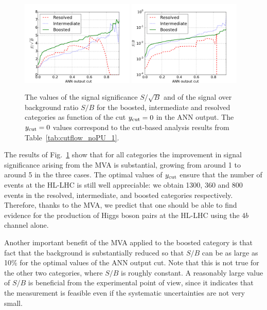 \begin{figure}[t]
\begin{center}
\includegraphics[width=0.48\textwidth]{plots/ssb_noPU.pdf}
\includegraphics[width=0.48\textwidth]{plots/sb_noPU.pdf}
\caption{\small
  The values of the signal significance $S/\sqrt{B}$ and of the
  signal over background ratio $S/B$ for the boosted, intermediate
  and resolved categories as  function of the cut
  $y_{\rm cut}=0$ in the ANN output.
  The $y_{\rm cut}=0$
  values correspond to the  cut-based analysis
  results from Table~\ref{tab:cutflow_noPU_1}.
}
\label{fig:sb_mva}
\end{center}
\end{figure}

The results of Fig.~\ref{fig:sb_mva}  show that
for all categories the  improvement in signal
significance arising from the MVA is substantial, growing from around 1
to around 5 in the three cases.
%
The optimal values of $y_{\rm cut}$ ensure that the
number of events at the HL-LHC is still well appreciable: we obtain
1300, 360 and 800 events in the resolved, intermediate, and
boosted categories respectively.
%
Therefore, thanks to the MVA, we predict that one should be able
to find evidence for the production of Higgs boson pairs
at the HL-LHC using the $4b$ channel alone.

Another important benefit of the MVA applied to the boosted
category is that fact that the background is substantially
reduced so that $S/B$ can be as large as 10\% for the optimal
values of the ANN output cut.
%
Note that this is not true for the other two categories,
where $S/B$ is roughly constant.
%
A reasonably large value of $S/B$ is beneficial
from the experimental point of view, since it indicates
that the measurement is feasible even if the
systematic uncertainties are not very small.



